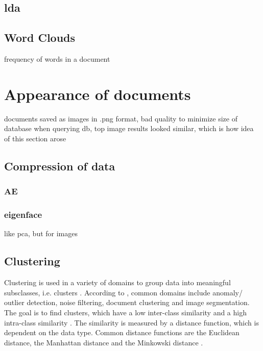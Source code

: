 \subsection{\ac{lda}}\label{subsec:latent-dirichlet-allocation}

\subsection{Word Clouds}\label{subsec:word-clouds}
frequency of words in a document


\section{Appearance of documents}\label{sec:appearance}
documents saved as images in .png format, bad quality to minimize size of database
when querying db, top image results looked similar, which is how idea of this section arose

\subsection{Compression of data}\label{subsec:compression}
\subsubsection{AE}\label{subsec:autoencoder}

\subsubsection{eigenface}\label{subsec:eigenface}
like pca, but for images

\subsection{Clustering}\label{subsec:clustering}

Clustering is used in a variety of domains to group data into meaningful subsclasses, i.e. clusters \cite{OPTICS2013, OPTICS2014, OPTICS_kMeans_2016}.
According to \citeauthor{OPTICS2013}, common domains include anomaly/ outlier detection, noise filtering, document clustering and image segmentation. 
The goal is to find clusters, which have a low inter-class similarity and a high intra-class similarity \cite{OPTICS2013}.
The similarity is measured by a distance function, which is dependent on the data type. 
Common distance functions are the Euclidean distance, the Manhattan distance and the Minkowski distance \cite{OPTICS_kMeans_2016}.

